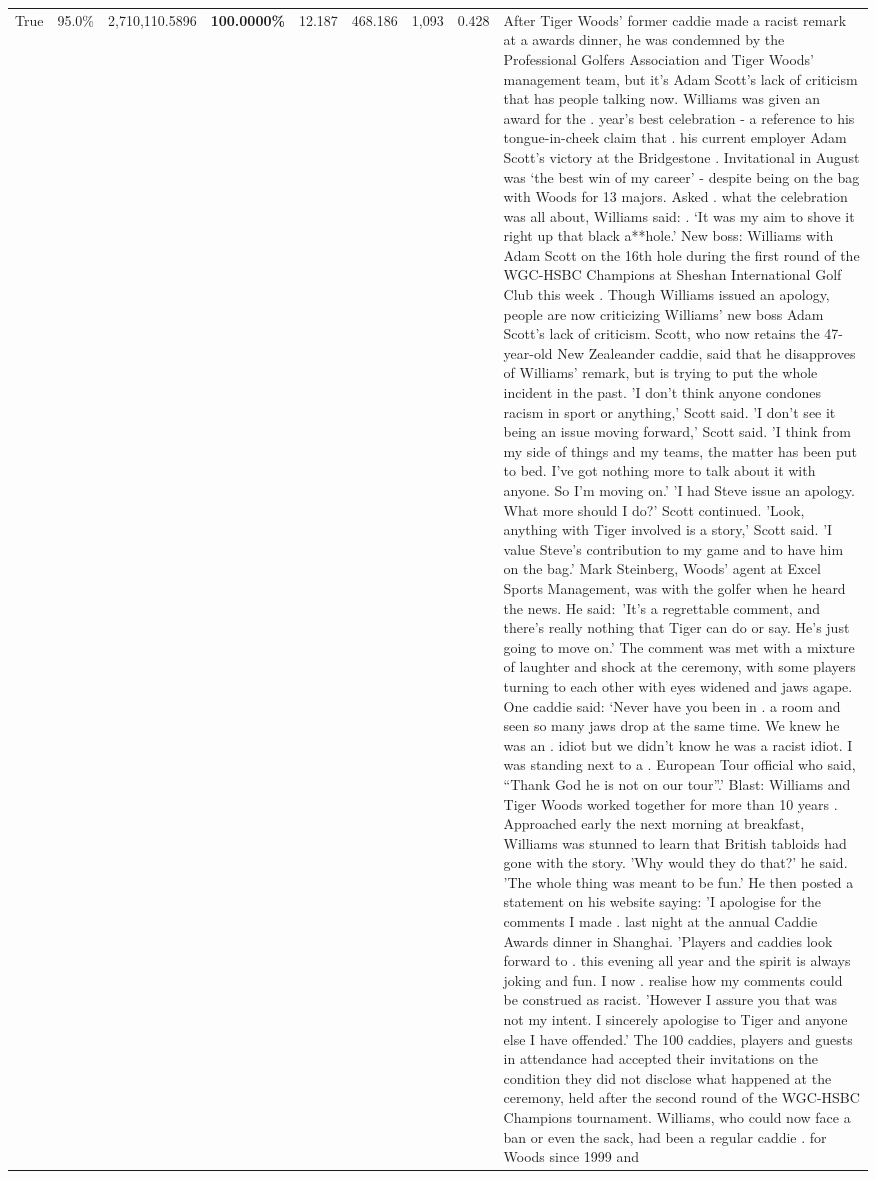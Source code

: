 \begin{table}[H]
\begin{tabular}{lllrlllll}
True & 95.0\% & 2,710,110.5896 & \bfseries \color{red} 100.0000\% & 12.187 & 468.186 & 1,093 & 0.428 & After Tiger Woods' former caddie made a racist remark at a awards dinner, he was condemned by the Professional Golfers Association and Tiger Woods' management team, but it's Adam Scott's lack of criticism that has people talking now. Williams was given an award for the . year’s best celebration - a reference to his tongue-in-cheek claim that . his current employer Adam Scott’s victory at the Bridgestone . Invitational in August was ‘the best win of my career’ - despite being on the bag with Woods for 13 majors. Asked . what the celebration was all about, Williams said: . ‘It was my aim to shove it right up that black a**hole.’ New boss: Williams with Adam Scott  on the 16th hole during the first round of the WGC-HSBC Champions at Sheshan International Golf Club this week . Though Williams issued an apology, people are now criticizing Williams' new boss Adam Scott's lack of criticism. Scott, who now retains the 47-year-old New Zealeander caddie, said that he disapproves of Williams' remark, but is trying to put the whole incident in the past. 'I don't think anyone condones racism in sport or anything,' Scott said. 'I don't see it being an issue moving forward,' Scott said. 'I think from my side of things and my teams, the matter has been put to bed. I've got nothing more to talk about it with anyone. So I'm moving on.' 'I had Steve issue an apology. What more should I do?' Scott continued. 'Look, anything with Tiger involved is a story,' Scott said. 'I value Steve's contribution to my game and to have him on the bag.' Mark Steinberg, Woods' agent at Excel Sports Management, was with the golfer when he heard the news. He said: 'It's a regrettable comment, and there's really nothing that Tiger can do or say. He's just going to move on.' The comment was met with a mixture of laughter and shock at the ceremony, with some players turning to each other with eyes widened and jaws agape. One caddie said: ‘Never have you been in . a room and seen so many jaws drop at the same time. We knew he was an . idiot but we didn’t know he was a racist idiot. I was standing next to a . European Tour official who said, “Thank God he is not on our tour”.’ Blast: Williams and Tiger Woods worked together for more than 10 years . Approached early the next morning at breakfast, Williams was stunned to learn that British tabloids had gone with the story. 'Why would they do that?' he said. 'The whole thing was meant to be fun.' He then posted a statement on his website saying: 'I apologise for the comments I made . last night at the annual Caddie Awards dinner in Shanghai. 'Players and caddies look forward to . this evening all year and the spirit is always joking and fun. I now . realise how my comments could be construed as racist. 'However I assure you that was not my intent. I sincerely apologise to Tiger and anyone else I have offended.' The 100 caddies, players and guests in attendance had accepted their invitations on the condition they did not disclose what happened at the ceremony, held after the second round of the WGC-HSBC Champions tournament. Williams, who could now face a ban or even the sack, had been a regular caddie . for Woods since 1999 and 
\end{tabular}
\end{table}
